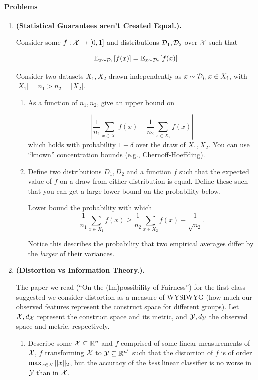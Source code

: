 \documentclass{article}
\theoremstyle{plain}
\newcommand{\E}{\mathbb{E}}
\newcommand{\R}{\mathbb{R}}
\newcommand\litem[1]{\item{\bfseries#1.\space}}
\begin{document}
\paragraph{Problems}
\begin{enumerate}
\litem{(Statistical Guarantees aren't Created Equal.)}


Consider some $f : \mathcal{X} \to [0,1]$ and distributions $\mathcal{D}_1, \mathcal{D}_2$ over
$\mathcal{X}$ such that

\[\E_{x \sim \D_1} [f(x)] = \E_{x \sim \D_2} [f(x)]\]

Consider two datasets $X_1, X_2$ drawn independently as
$ x \sim \mathcal{D}_i, x \in X_i$, with $|X_1| = n_1 > n_2 = |X_2|$.

\begin{enumerate}
  \item
As a
function of $n_1, n_2$, give an upper bound on

\[ |\frac{1}{n_1} \sum_{x \in X_1} f(x) - \frac{1}{n_2}\sum_{x \in X_2} f(x)|\]
%
which holds with probability $1-\delta$ over the draw of $X_1,
X_2$. You can use ``known'' concentration bounds (e.g., Chernoff-Hoeffding).

\item
 { \color{red} Define two distributions $D_1, D_2$ and a function $f$ such that the expected value of $f$ on a draw from either distribution is equal. Define these such that you can get a large  lower bound on the probability below.}
  
  
  Lower bound the probability with which
  \[\frac{1}{n_1} \sum_{x \in X_1} f(x)   \geq  \frac{1}{n_2}\sum_{x \in X_2} f(x) + \frac{1}{\sqrt{n_2}}. \]

  Notice this describes the probability that two empirical averages differ by the \emph{larger} of their variances.
\end{enumerate}


\litem{(Distortion vs Information Theory.)}


The paper we read (``On the (Im)possibility of Fairness'') for the
first class suggested we consider distortion as a measure of WYSIWYG
(how much our observed features represent the construct space for
different groups). Let $\mathcal{X}, d_{\mathcal{X}}$ represent the construct space and
its metric, and $\mathcal{Y}, d_{\mathcal{Y}}$ the observed space and metric,
respectively.

\begin{enumerate}
  \item Describe some $\X\subseteq \R^n$ and $f$ comprised of some linear
  measurements of $\mathcal{X}$, $f$ transforming $\mathcal{X}$ to $\Y \subseteq \R^{n'}$ such that the
  distortion of $f$ is of order $\max_{x \in \mathcal{X}}||x ||_2$, but the
  accuracy of the \emph{best} linear classifier is no worse in $\mathcal{Y}$
  than in $\mathcal{X}$.


\end{enumerate}
\end{enumerate}
\end{document}
